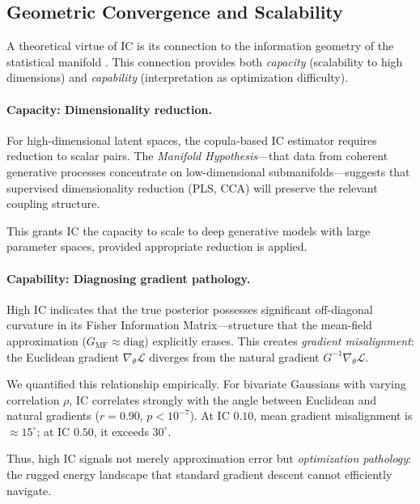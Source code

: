 \documentclass[10pt]{article} %
\theoremstyle{plain}
\theoremstyle{definition}
\begin{document}
\subsection{Geometric Convergence and Scalability}

A theoretical virtue of IC is its connection to the information geometry of the statistical manifold \citep{amari2016information}. This connection provides both \emph{capacity} (scalability to high dimensions) and \emph{capability} (interpretation as optimization difficulty).

\paragraph{Capacity: Dimensionality reduction.} For high-dimensional latent spaces, the copula-based IC estimator requires reduction to scalar pairs. The \emph{Manifold Hypothesis}---that data from coherent generative processes concentrate on low-dimensional submanifolds---suggests that supervised dimensionality reduction (PLS, CCA) will preserve the relevant coupling structure.

This grants IC the capacity to scale to deep generative models with large parameter spaces, provided appropriate reduction is applied.

\paragraph{Capability: Diagnosing gradient pathology.} High IC indicates that the true posterior possesses significant off-diagonal curvature in its Fisher Information Matrix---structure that the mean-field approximation ($G_{\text{MF}} \approx \text{diag}$) explicitly erases. This creates \emph{gradient misalignment}: the Euclidean gradient $\nabla_\theta \mathcal{L}$ diverges from the natural gradient $G^{-1}\nabla_\theta \mathcal{L}$.

We quantified this relationship empirically. For bivariate Gaussians with varying correlation $\rho$, IC correlates strongly with the angle between Euclidean and natural gradients ($r = 0.90$, $p < 10^{-7}$). At IC $ 0.10$, mean gradient misalignment is $\approx 15^{\circ}$; at IC $ 0.50$, it exceeds $30^{\circ}$.

Thus, high IC signals not merely approximation error but \emph{optimization pathology}: the rugged energy landscape that standard gradient descent cannot efficiently navigate.
\end{document}
